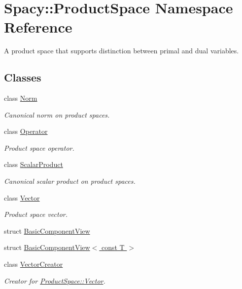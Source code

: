 \hypertarget{namespaceSpacy_1_1ProductSpace}{\section{Spacy\-:\-:Product\-Space Namespace Reference}
\label{namespaceSpacy_1_1ProductSpace}
}


A product space that supports distinction between primal and dual variables.  


\subsection*{Classes}
\begin{DoxyCompactItemize}
\item 
class \hyperlink{classSpacy_1_1ProductSpace_1_1Norm}{Norm}
\begin{DoxyCompactList}\small\item\em Canonical norm on product spaces. \end{DoxyCompactList}\item 
class \hyperlink{classSpacy_1_1ProductSpace_1_1Operator}{Operator}
\begin{DoxyCompactList}\small\item\em Product space operator. \end{DoxyCompactList}\item 
class \hyperlink{classSpacy_1_1ProductSpace_1_1ScalarProduct}{Scalar\-Product}
\begin{DoxyCompactList}\small\item\em Canonical scalar product on product spaces. \end{DoxyCompactList}\item 
class \hyperlink{classSpacy_1_1ProductSpace_1_1Vector}{Vector}
\begin{DoxyCompactList}\small\item\em Product space vector. \end{DoxyCompactList}\item 
struct \hyperlink{structSpacy_1_1ProductSpace_1_1BasicComponentView}{Basic\-Component\-View}
\item 
struct \hyperlink{structSpacy_1_1ProductSpace_1_1BasicComponentView_3_01const_01T_01_4}{Basic\-Component\-View$<$ const T $>$}
\item 
class \hyperlink{classSpacy_1_1ProductSpace_1_1VectorCreator}{Vector\-Creator}
\begin{DoxyCompactList}\small\item\em Creator for \hyperlink{classSpacy_1_1ProductSpace_1_1Vector}{Product\-Space\-::\-Vector}. \end{DoxyCompactList}\end{DoxyCompactItemize}
